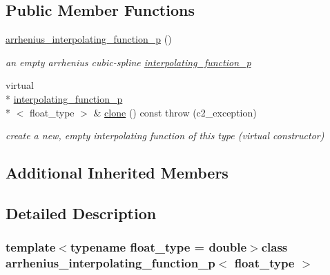 \subsection*{Public Member Functions}
\begin{DoxyCompactItemize}
\item 
\hypertarget{classarrhenius__interpolating__function__p_ad0557b1774e14d7a310aa14bb64d6bc5}{\hyperlink{classarrhenius__interpolating__function__p_ad0557b1774e14d7a310aa14bb64d6bc5}{arrhenius\-\_\-interpolating\-\_\-function\-\_\-p} ()}\label{classarrhenius__interpolating__function__p_ad0557b1774e14d7a310aa14bb64d6bc5}

\begin{DoxyCompactList}\small\item\em an empty arrhenius cubic-\/spline \hyperlink{classinterpolating__function__p}{interpolating\-\_\-function\-\_\-p} \end{DoxyCompactList}\item 
\hypertarget{classarrhenius__interpolating__function__p_aad3096d6df4488e4226036fb52298ffa}{virtual \\*
\hyperlink{classinterpolating__function__p}{interpolating\-\_\-function\-\_\-p}\\*
$<$ float\-\_\-type $>$ \& \hyperlink{classarrhenius__interpolating__function__p_aad3096d6df4488e4226036fb52298ffa}{clone} () const   throw (c2\-\_\-exception)}\label{classarrhenius__interpolating__function__p_aad3096d6df4488e4226036fb52298ffa}

\begin{DoxyCompactList}\small\item\em create a new, empty interpolating function of this type (virtual constructor) \end{DoxyCompactList}\end{DoxyCompactItemize}
\subsection*{Additional Inherited Members}


\subsection{Detailed Description}
\subsubsection*{template$<$typename float\-\_\-type = double$>$class arrhenius\-\_\-interpolating\-\_\-function\-\_\-p$<$ float\-\_\-type $>$}

